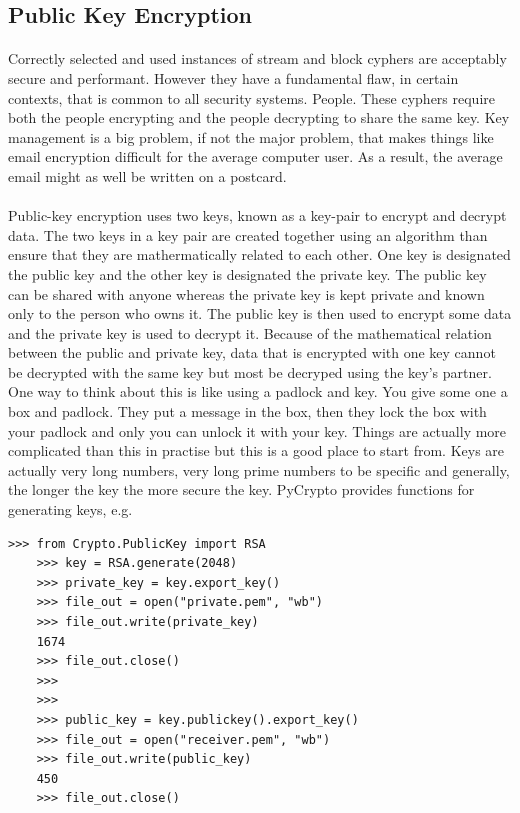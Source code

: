 \documentclass[12pt, a4paper, oneside]{book}
\begin{document}
{\subsection{Public Key Encryption}
\paragraph{} Correctly selected and used instances of stream and block cyphers are acceptably secure and performant. However they have a fundamental flaw, in certain contexts, that is common to all security systems. People. These cyphers require both the people encrypting and the people decrypting to share the same key. Key management is a big problem, if not the major problem, that makes things like email encryption difficult for the average computer user. As a result, the average email might as well be written on a postcard.

\paragraph{} Public-key encryption uses two keys, known as a key-pair to encrypt and decrypt data. The two keys in a key pair are created together using an algorithm than ensure that they are mathermatically related to each other. One key is designated the public key and the other key is designated the private key. The public key can be shared with anyone whereas the private key is kept private and known only to the person who owns it. The public key is then used to encrypt some data and the private key is used to decrypt it. Because of the mathematical relation between the public and private key, data that is encrypted with one key cannot be decrypted with the same key but most be decryped using the key's partner. One way to think about this is like using a padlock and key. You give some one a box and padlock. They put a message in the box, then they lock the box with your padlock and only you can unlock it with your key. Things are actually more complicated than this in practise but this is a good place to start from. Keys are actually very long numbers, very long prime numbers to be specific and generally, the longer the key the more secure the key. PyCrypto provides functions for generating keys, e.g.

\begin{lstlisting}[style=DOS]
    >>> from Crypto.PublicKey import RSA
    >>> key = RSA.generate(2048)
    >>> private_key = key.export_key()
    >>> file_out = open("private.pem", "wb")
    >>> file_out.write(private_key)
    1674
    >>> file_out.close()
    >>> 
    >>> 
    >>> public_key = key.publickey().export_key()
    >>> file_out = open("receiver.pem", "wb")
    >>> file_out.write(public_key)
    450
    >>> file_out.close()
\end{lstlisting}

}
\end{document}
